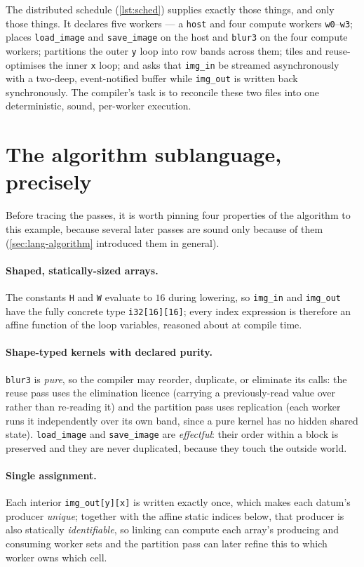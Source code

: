 The distributed schedule (\cref{lst:sched}) supplies exactly those things, and only
those things. It declares five workers --- a \texttt{host} and four compute workers
\texttt{w0}--\texttt{w3}; places \texttt{load\_image} and \texttt{save\_image} on
the host and \texttt{blur3} on the four compute workers; partitions the outer
\texttt{y} loop into row bands across them; tiles and reuse-optimises the inner
\texttt{x} loop; and asks that \texttt{img\_in} be streamed asynchronously with a
two-deep, event-notified buffer while \texttt{img\_out} is written back
synchronously. The compiler's task is to reconcile these two files into one
deterministic, sound, per-worker execution.

\section{The algorithm sublanguage, precisely}\label{sec:wt-semantics}

Before tracing the passes, it is worth pinning four properties of the algorithm to
this example, because several later passes are sound only because of them
(\cref{sec:lang-algorithm} introduced them in general).

\paragraph{Shaped, statically-sized arrays.} The constants \texttt{H} and
\texttt{W} evaluate to $16$ during lowering, so \texttt{img\_in} and
\texttt{img\_out} have the fully concrete type \texttt{i32[16][16]}; every index
expression is therefore an affine function of the loop variables, reasoned about at
compile time.

\paragraph{Shape-typed kernels with declared purity.} \texttt{blur3} is
\emph{pure}, so the compiler may reorder, duplicate, or eliminate its calls: the
reuse pass uses the elimination licence (carrying a previously-read value over
rather than re-reading it) and the partition pass uses replication (each worker runs
it independently over its own band, since a pure kernel has no hidden shared state).
\texttt{load\_image} and \texttt{save\_image} are \emph{effectful}: their order
within a block is preserved and they are never duplicated, because they touch the
outside world.

\paragraph{Single assignment.} Each interior \texttt{img\_out[y][x]} is written
exactly once, which makes each datum's producer \emph{unique}; together with the
affine static indices below, that producer is also statically \emph{identifiable},
so linking can compute each array's producing and consuming worker sets and the
partition pass can later refine this to which worker owns which cell.

